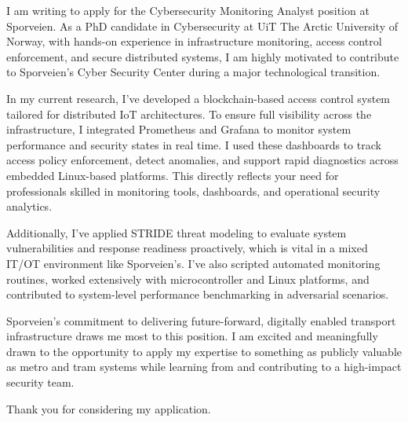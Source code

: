 I am writing to apply for the Cybersecurity Monitoring Analyst position at Sporveien. As a PhD candidate in Cybersecurity at UiT The Arctic University of Norway, with hands-on experience in infrastructure monitoring, access control enforcement, and secure distributed systems, I am highly motivated to contribute to Sporveien’s Cyber Security Center during a major technological transition.

In my current research, I’ve developed a blockchain-based access control system tailored for distributed IoT architectures. To ensure full visibility across the infrastructure, I integrated Prometheus and Grafana to monitor system performance and security states in real time. I used these dashboards to track access policy enforcement, detect anomalies, and support rapid diagnostics across embedded Linux-based platforms. This directly reflects your need for professionals skilled in monitoring tools, dashboards, and operational security analytics.

Additionally, I’ve applied STRIDE threat modeling to evaluate system vulnerabilities and response readiness proactively, which is vital in a mixed IT/OT environment like Sporveien’s. I’ve also scripted automated monitoring routines, worked extensively with microcontroller and Linux platforms, and contributed to system-level performance benchmarking in adversarial scenarios.

Sporveien’s commitment to delivering future-forward, digitally enabled transport infrastructure draws me most to this position. I am excited and meaningfully drawn to the opportunity to apply my expertise to something as publicly valuable as metro and tram systems while learning from and contributing to a high-impact security team.

Thank you for considering my application. 
